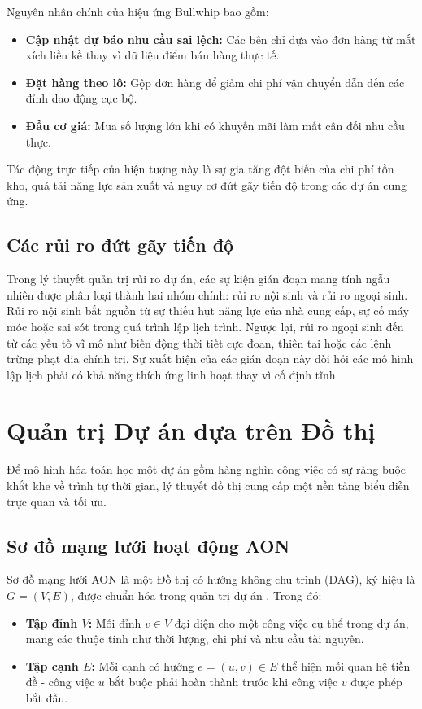 Nguyên nhân chính của hiệu ứng Bullwhip bao gồm:
\begin{itemize}
    \item \textbf{Cập nhật dự báo nhu cầu sai lệch:} Các bên chỉ dựa vào đơn hàng từ mắt xích liền kề thay vì dữ liệu điểm bán hàng thực tế.
    \item \textbf{Đặt hàng theo lô:} Gộp đơn hàng để giảm chi phí vận chuyển dẫn đến các đỉnh dao động cục bộ.
    \item \textbf{Đầu cơ giá:} Mua số lượng lớn khi có khuyến mãi làm mất cân đối nhu cầu thực.
\end{itemize}
Tác động trực tiếp của hiện tượng này là sự gia tăng đột biến của chi phí tồn kho, quá tải năng lực sản xuất và nguy cơ đứt gãy tiến độ trong các dự án cung ứng.

\subsection{Các rủi ro đứt gãy tiến độ}
Trong lý thuyết quản trị rủi ro dự án, các sự kiện gián đoạn mang tính ngẫu nhiên được phân loại thành hai nhóm chính: rủi ro nội sinh và rủi ro ngoại sinh. Rủi ro nội sinh bắt nguồn từ sự thiếu hụt năng lực của nhà cung cấp, sự cố máy móc hoặc sai sót trong quá trình lập lịch trình. Ngược lại, rủi ro ngoại sinh đến từ các yếu tố vĩ mô như biến động thời tiết cực đoan, thiên tai hoặc các lệnh trừng phạt địa chính trị. Sự xuất hiện của các gián đoạn này đòi hỏi các mô hình lập lịch phải có khả năng thích ứng linh hoạt thay vì cố định tĩnh.

\section{Quản trị Dự án dựa trên Đồ thị}
Để mô hình hóa toán học một dự án gồm hàng nghìn công việc có sự ràng buộc khắt khe về trình tự thời gian, lý thuyết đồ thị cung cấp một nền tảng biểu diễn trực quan và tối ưu.

\subsection{Sơ đồ mạng lưới hoạt động AON}
Sơ đồ mạng lưới AON là một Đồ thị có hướng không chu trình (DAG), ký hiệu là $G = (V, E)$, được chuẩn hóa trong quản trị dự án \cite{pmbok2017}. Trong đó:
\begin{itemize}
    \item \textbf{Tập đỉnh $V$:} Mỗi đỉnh $v \in V$ đại diện cho một công việc cụ thể trong dự án, mang các thuộc tính như thời lượng, chi phí và nhu cầu tài nguyên.
    \item \textbf{Tập cạnh $E$:} Mỗi cạnh có hướng $e = (u, v) \in E$ thể hiện mối quan hệ tiền đề - công việc $u$ bắt buộc phải hoàn thành trước khi công việc $v$ được phép bắt đầu.
\end{itemize}

